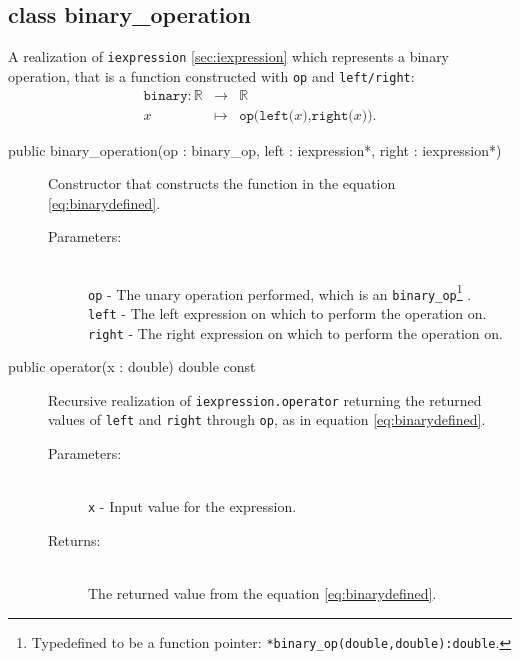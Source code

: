 \documentclass[a4paper,11pt]{kth-mag}
\newcommand{\RR}{\ensuremath{\mathbb{R}}}
\begin{document}
\subsection{class binary\_operation} A realization of \texttt{iexpression}
\ref{sec:iexpression} which represents a binary operation, that is a function
constructed with \texttt{op} and \texttt{left/right}:
\begin{eqnarray}
    \label{eq:binarydefined}
    \texttt{binary}: \RR &\rightarrow& \RR \nonumber \\
    x &\mapsto& \texttt{op(left(}x\texttt{),right(}x\texttt{))}.
\end{eqnarray}
\begin{description}
    \item[public binary\_operation(op : binary\_op, left : iexpression*, right :
    iexpression*)] Constructor that constructs the function in the equation
    \ref{eq:binarydefined}. 
    \begin{description}
        \item[Parameters:]~\\
            \verb+op+ - The unary operation performed, which is an
            \texttt{binary\_op}\footnote{Typedefined to
            be a function pointer: \texttt{*binary\_op(double,double):double}.} .\\
            \verb+left+ - The left expression on which to perform the
            operation on. \\
            \verb+right+ - The right expression on which to perform the
            operation on.
    \end{description}
\end{description}
\begin{description}
    \item[public operator(x : double) double const] 
    Recursive realization of \texttt{iexpression.operator} returning the
    returned values of \texttt{left} and \texttt{right} through \texttt{op},
    as in equation \ref{eq:binarydefined}.
    \begin{description}
        \item[Parameters:]~\\
            \verb+x+ - Input value for the expression.
        \item[Returns:]~\\
            The returned value from the equation \ref{eq:binarydefined}.
    \end{description}
\end{description}
\end{document}
